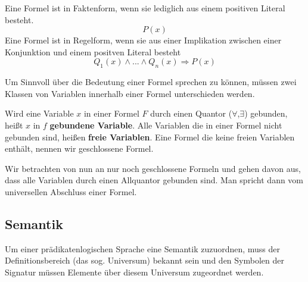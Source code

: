 \begin{leftbar}
  \begin{definition}
    \newline
    Eine Formel ist in Faktenform, wenn sie lediglich aus einem positiven Literal besteht.
    \begin{equation}
      P(x)
    \end{equation}
    \newline
    Eine Formel ist in Regelform, wenn sie aus einer Implikation zwischen einer Konjunktion und einem positven Literal besteht
    \begin{equation}
      Q_1(x) \wedge ... \wedge Q_n(x) \Rightarrow P(x)
    \end{equation}
  \end{definition}
\end{leftbar}
\noindent
Um Sinnvoll über die Bedeutung einer Formel sprechen zu können, müssen zwei Klassen von Variablen innerhalb einer Formel unterschieden werden.
\newpage
\begin{leftbar}
  \begin{definition}
    \newline
    Wird eine Variable $x$ in einer Formel $F$ durch einen Quantor ($\forall$,$\exists$) gebunden, heißt $x$ in $f$ \textbf{gebundene Variable}.\newline
    \newline
    Alle Variablen die in einer Formel nicht gebunden sind, heißen \textbf{freie Variablen}.
    \newline
    Eine Formel die keine freien Variablen enthält, nennen wir geschlossene Formel.
  \end{definition}
\end{leftbar}
\noindent
Wir betrachten von nun an nur noch geschlossene Formeln und gehen davon aus, dass alle Variablen durch einen Allquantor gebunden sind. Man spricht dann vom universellen Abschluss einer Formel.

\subsection{Semantik}
Um einer prädikatenlogischen Sprache eine Semantik zuzuordnen, muss der Definitionsbereich (das sog. Universum) bekannt sein und den Symbolen der Signatur müssen Elemente über diesem Universum zugeordnet werden.

